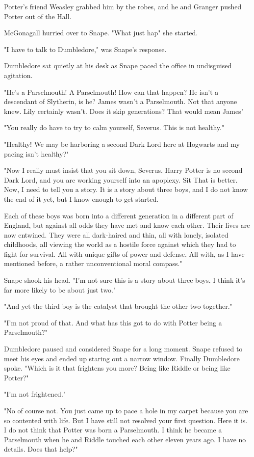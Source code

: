 Potter's friend Weasley grabbed him by the robes, and he and Granger pushed Potter out of the Hall.

McGonagall hurried over to Snape. "What just hap{\el}" she started.

"I have to talk to Dumbledore," was Snape's response.

Dumbledore sat quietly at his desk as Snape paced the office in undisguised agitation.

"He's a Parselmouth! A Parselmouth! How can that happen? He isn't a descendant of Slytherin, is he? James wasn't a Parselmouth. Not that anyone knew. Lily certainly wasn't. Does it skip generations? That would mean James{\el}"

"You really do have to try to calm yourself, Severus. This is not healthy."

"Healthy! We may be harboring a second Dark Lord here at Hogwarts and my pacing isn't healthy?"

"Now I really must insist that you sit down, Severus. Harry Potter is no second Dark Lord, and you are working yourself into an apoplexy. Sit{\el} That is better. Now, I need to tell you a story. It is a story about three boys, and I do not know the end of it yet, but I know enough to get started.

\textooquote Each of these boys was born into a different generation in a different part of England, but against all odds they have met and know each other. Their lives are now entwined. They were all dark-haired and thin, all with lonely, isolated childhoods, all viewing the world as a hostile force against which they had to fight for survival. All with unique gifts of power and defense. All with, as I have mentioned before, a rather unconventional moral compass."

Snape shook his head. "I'm not sure this is a story about three boys. I think it's far more likely to be about just two."

"And yet the third boy is the catalyst that brought the other two together."

"I'm not proud of that. And what has this got to do with Potter being a Parselmouth?"

Dumbledore paused and considered Snape for a long moment. Snape refused to meet his eyes and ended up staring out a narrow window. Finally Dumbledore spoke. "Which is it that frightens you more? Being like Riddle or being like Potter?"

"I'm not frightened."

"No of course not. You just came up to pace a hole in my carpet because you are so contented with life. But I have still not resolved your first question. Here it is. I do not think that Potter was born a Parselmouth. I think he became a Parselmouth when he and Riddle touched each other eleven years ago. I have no details. Does that help?"

